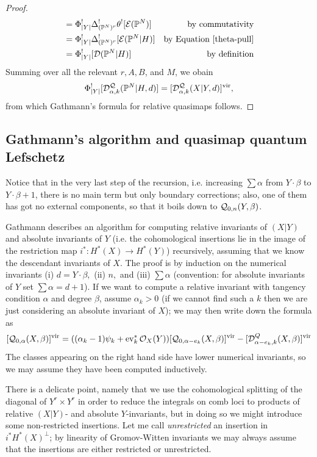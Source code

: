 \begin{proof}
\begin{align*}
& =  \Phi_{\lvert Y\rvert}^!\Delta_{(\mathbb P^N)^r}^!\theta^! [\mathcal E(\mathbb P^N)] & \text{by commutativity} \\
& = \Phi_{\lvert Y\rvert}^! \Delta_{(\mathbb P^N)^r}^! [\mathcal{E}(\mathbb P^N|H)] & \text{by Equation \eqref{theta-pull}} \\
& =  \Phi_{\lvert Y\rvert}^![\mathcal{D}(\mathbb P^N|H)] & \text{by definition}
\end{align*}
Summing over all the relevant $r, A, B$, and $M$, we obain \[\Phi_{|Y|}^![\mathcal{D}^{\mathcal{Q}}_{\alpha,k}(\mathbb P^N|H,d)]=[\mathcal{D}^{\mathcal{Q}}_{\alpha,k}(X|Y,d)]^{\mathrm{vir}},\] from which Gathmann's formula for relative quasimaps follows. \end{proof}

\subsection{Gathmann's algorithm and quasimap quantum Lefschetz} Notice that in the very last step of the recursion, i.e. increasing $\sum\alpha$ from $Y\cdot \beta$ to $Y\cdot \beta+1$, there is no main term but only boundary corrections; also, one of them has got no external components, so that it boils down to $\mathcal{Q}_{0,n}(Y,\beta)$.

Gathmann describes an algorithm for computing relative invariants of $(X|Y)$ and  absolute invariants of $Y$ (i.e. the cohomological insertions lie in the image of the restriction map $i^*\colon H^*(X)\to H^*(Y)$) recursively, assuming that we know the descendant invariants of $X$. The proof is by induction on the numerical invariants (i) $d=Y\cdot \beta,$ (ii) $n,$ and (iii) $\sum\alpha$ (convention: for absolute invariants of $Y$ set $\sum\alpha=d+1$). If we want to compute a relative invariant with tangency condition $\alpha$ and degree $\beta$, assume $\alpha_k>0$ (if we cannot find such a $k$ then we are just considering an absolute invariant of $X$); we may then write down the formula as
\[[\mathcal{Q}_{0,\alpha}(X,\beta)]^{\mathrm{vir}}=((\alpha_k-1)\psi_k+\operatorname{ev}_k^*\mathcal{O}_X(Y))[\mathcal{Q}_{0,\alpha-e_k}(X,\beta)]^{\mathrm{vir}}-[\mathcal{D}^Q_{\alpha-e_k,k}(X,\beta)]^{\mathrm{vir}}\]
The classes appearing on the right hand side have lower numerical invariants, so we may assume they have been computed inductively.

There is a delicate point, namely that we use the cohomological splitting of the diagonal of $Y^r\times Y^r$ in order to reduce the integrals on comb loci to products of relative $(X|Y)$- and absolute $Y$-invariants, but in doing so we might introduce some non-restricted insertions.
Let me call \emph{unrestricted} an insertion in $i^*H^*(X)^\perp$; by linearity of Gromov-Witten invariants we may always assume that the insertions are either restricted or unrestricted.

